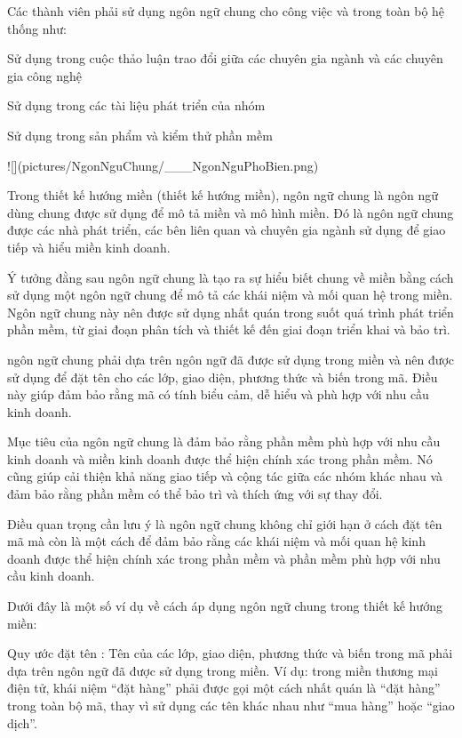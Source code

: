 Các thành viên phải sử dụng ngôn ngữ chung cho công việc và trong toàn bộ hệ thống như:

Sử dụng trong cuộc thảo luận trao đổi giữa các chuyên gia ngành và các chuyên gia công nghệ

Sử dụng trong các tài liệu phát triển của nhóm

Sử dụng trong sản phẩm và kiểm thử phần mềm

![](pictures/NgonNguChung/___NgonNguPhoBien.png)







Trong thiết kế hướng miền (thiết kế hướng miền), ngôn ngữ chung là ngôn ngữ dùng chung được sử dụng để mô tả miền và mô hình miền. Đó là ngôn ngữ chung được các nhà phát triển, các bên liên quan và chuyên gia ngành sử dụng để giao tiếp và hiểu miền kinh doanh.

Ý tưởng đằng sau ngôn ngữ chung là tạo ra sự hiểu biết chung về miền bằng cách sử dụng một ngôn ngữ chung để mô tả các khái niệm và mối quan hệ trong miền. Ngôn ngữ chung này nên được sử dụng nhất quán trong suốt quá trình phát triển phần mềm, từ giai đoạn phân tích và thiết kế đến giai đoạn triển khai và bảo trì.

ngôn ngữ chung phải dựa trên ngôn ngữ đã được sử dụng trong miền và nên được sử dụng để đặt tên cho các lớp, giao diện, phương thức và biến trong mã. Điều này giúp đảm bảo rằng mã có tính biểu cảm, dễ hiểu và phù hợp với nhu cầu kinh doanh.

Mục tiêu của ngôn ngữ chung là đảm bảo rằng phần mềm phù hợp với nhu cầu kinh doanh và miền kinh doanh được thể hiện chính xác trong phần mềm. Nó cũng giúp cải thiện khả năng giao tiếp và cộng tác giữa các nhóm khác nhau và đảm bảo rằng phần mềm có thể bảo trì và thích ứng với sự thay đổi.

Điều quan trọng cần lưu ý là ngôn ngữ chung không chỉ giới hạn ở cách đặt tên mã mà còn là một cách để đảm bảo rằng các khái niệm và mối quan hệ kinh doanh được thể hiện chính xác trong phần mềm và phần mềm phù hợp với nhu cầu kinh doanh.

Dưới đây là một số ví dụ về cách áp dụng ngôn ngữ chung trong thiết kế hướng miền:

Quy ước đặt tên : Tên của các lớp, giao diện, phương thức và biến trong mã phải dựa trên ngôn ngữ đã được sử dụng trong miền. Ví dụ: trong miền thương mại điện tử, khái niệm “đặt hàng” phải được gọi một cách nhất quán là “đặt hàng” trong toàn bộ mã, thay vì sử dụng các tên khác nhau như “mua hàng” hoặc “giao dịch”.

